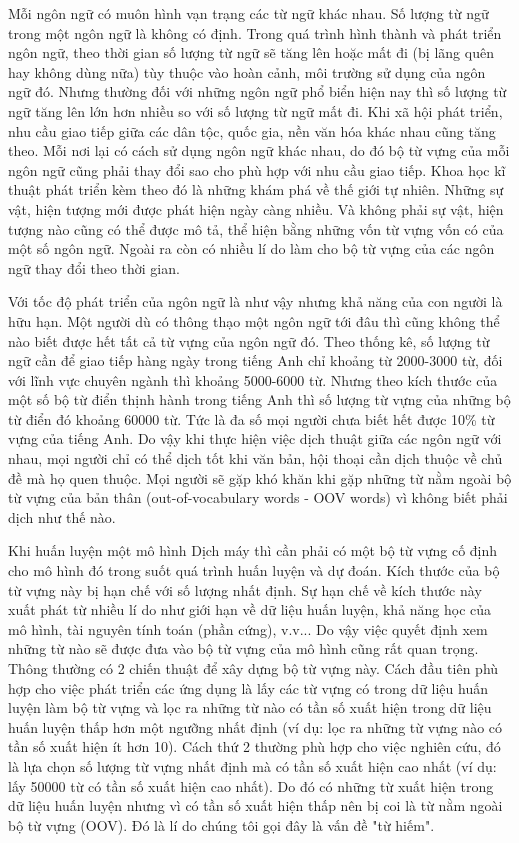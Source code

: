 Mỗi ngôn ngữ có muôn hình vạn trạng các từ ngữ khác nhau. Số lượng từ ngữ trong một ngôn ngữ là không có định. Trong quá trình hình thành và phát triển ngôn ngữ, theo thời gian số lượng từ ngữ sẽ tăng lên hoặc mất đi (bị lãng quên hay không dùng nữa) tùy thuộc vào hoàn cảnh, môi trường sử dụng của ngôn ngữ đó. Nhưng thường đối với những ngôn ngữ phổ biển hiện nay thì số lượng từ ngữ tăng lên lớn hơn nhiều so với số lượng từ ngữ mất đi. Khi xã hội phát triển, nhu cầu giao tiếp giữa các dân tộc, quốc gia, nền văn hóa khác nhau cũng tăng theo. Mỗi nơi lại có cách sử dụng ngôn ngữ khác nhau, do đó bộ từ vựng của mỗi ngôn ngữ cũng phải thay đổi sao cho phù hợp với nhu cầu giao tiếp. Khoa học kĩ thuật phát triển kèm theo đó là những khám phá về thế giới tự nhiên. Những sự vật, hiện tượng mới được phát hiện ngày càng nhiều. Và không phải sự vật, hiện tượng nào cũng có thể được mô tả, thể hiện bằng những vốn từ vựng vốn có của một số ngôn ngữ. Ngoài ra còn có nhiều lí do làm cho bộ từ vựng của các ngôn ngữ thay đổi theo thời gian.

Với tốc độ phát triển của ngôn ngữ là như vậy nhưng khả năng của con người là hữu hạn. Một người dù có thông thạo một ngôn ngữ tới đâu thì cũng không thể nào biết được hết tất cả từ vựng của ngôn ngữ đó. Theo thống kê, số lượng từ ngữ cần để giao tiếp hàng ngày trong tiếng Anh chỉ khoảng từ 2000-3000 từ, đối với lĩnh vực chuyên ngành thì khoảng 5000-6000 từ. Nhưng theo kích thước của một số bộ từ điển thịnh hành trong tiếng Anh thì số lượng từ vựng của những bộ từ điển đó khoảng 60000 từ. Tức là đa số mọi người chưa biết hết được 10\% từ vựng của tiếng Anh. Do vậy khi thực hiện việc dịch thuật giữa các ngôn ngữ với nhau, mọi người chỉ có thể dịch tốt khi văn bản, hội thoại cần dịch thuộc về chủ đề mà họ quen thuộc. Mọi người sẽ gặp khó khăn khi gặp những từ nằm ngoài bộ từ vựng của bản thân (out-of-vocabulary words - OOV words) vì không biết phải dịch như thế nào.

Khi huấn luyện một mô hình Dịch máy thì cần phải có một bộ từ vựng cố định cho mô hình đó trong suốt quá trình huấn luyện và dự đoán. Kích thước của bộ từ vựng này bị hạn chế với số lượng nhất định. Sự hạn chế về kích thước này xuất phát từ nhiều lí do như giới hạn về dữ liệu huấn luyện, khả năng học của mô hình, tài nguyên tính toán (phần cứng), v.v... Do vậy việc quyết định xem những từ nào sẽ được đưa vào bộ từ vựng của mô hình cũng rất quan trọng. Thông thường có 2 chiến thuật để xây dựng bộ từ vựng này. Cách đầu tiên phù hợp cho việc phát triển các ứng dụng là lấy các từ vựng có trong dữ liệu huấn luyện làm bộ từ vựng và lọc ra những từ nào có tần số xuất hiện trong dữ liệu huấn luyện thấp hơn một ngưỡng nhất định (ví dụ: lọc ra những từ vựng nào có tần số xuất hiện ít hơn 10). Cách thứ 2 thường phù hợp cho việc nghiên cứu, đó là lựa chọn số lượng từ vựng nhất định mà có tần số xuất hiện cao nhất (ví dụ: lấy 50000 từ có tần số xuất hiện cao nhất). Do đó có những từ xuất hiện trong dữ liệu huấn luyện nhưng vì có tần số xuất hiện thấp nên bị coi là từ nằm ngoài bộ từ vựng (OOV). Đó là lí do chúng tôi gọi đây là vấn đề "từ hiếm".

